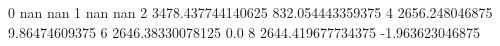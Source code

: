 0 nan nan
1 nan nan
2 3478.437744140625 832.054443359375
4 2656.248046875 9.86474609375
6 2646.38330078125 0.0
8 2644.419677734375 -1.963623046875
